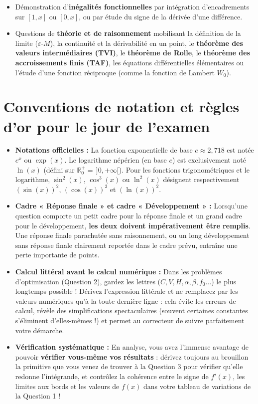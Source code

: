 \documentclass[11pt,a4paper,oneside]{book}
\newcommand{\R}{\mathbb{R}}
\begin{document}
\begin{enumerate}
\begin{itemize}
        \item Démonstration d'\textbf{inégalités fonctionnelles} par intégration d'encadrements sur $[1, x]$ ou $[0, x]$, ou par étude du signe de la dérivée d'une différence.
        \item Questions de \textbf{théorie et de raisonnement} mobilisant la définition de la limite ($\varepsilon$-$M$), la continuité et la dérivabilité en un point, le \textbf{théorème des valeurs intermédiaires (TVI)}, le \textbf{théorème de Rolle}, le \textbf{théorème des accroissements finis (TAF)}, les équations différentielles élémentaires ou l'étude d'une fonction réciproque (comme la fonction de Lambert $W_0$).
    \end{itemize}
\end{enumerate}

\section*{Conventions de notation et règles d'or pour le jour de l'examen}

\begin{itemize}
    \item \textbf{Notations officielles :} La fonction exponentielle de base $e \approx 2,718$ est notée $e^x$ ou $\exp(x)$. Le logarithme népérien (en base $e$) est exclusivement noté $\ln(x)$ (défini sur $\R_0^+ = \,]0, +\infty[$). Pour les fonctions trigonométriques et le logarithme, $\sin^2(x)$, $\cos^3(x)$ ou $\ln^2(x)$ désignent respectivement $(\sin(x))^2$, $(\cos(x))^3$ et $(\ln(x))^2$.
    \item \textbf{Cadre « Réponse finale » et cadre « Développement » :} Lorsqu'une question comporte un petit cadre pour la réponse finale et un grand cadre pour le développement, \textbf{les deux doivent impérativement être remplis}. Une réponse finale parachutée sans raisonnement, ou un long développement sans réponse finale clairement reportée dans le cadre prévu, entraîne une perte importante de points.
    \item \textbf{Calcul littéral avant le calcul numérique :} Dans les problèmes d'optimisation (Question 2), gardez les lettres ($C, V, H, \alpha, \beta, f_0\dots$) le plus longtemps possible ! Dérivez l'expression littérale et ne remplacez par les valeurs numériques qu'à la toute dernière ligne : cela évite les erreurs de calcul, révèle des simplifications spectaculaires (souvent certaines constantes s'éliminent d'elles-mêmes !) et permet au correcteur de suivre parfaitement votre démarche.
    \item \textbf{Vérification systématique :} En analyse, vous avez l'immense avantage de pouvoir \textbf{vérifier vous-même vos résultats} : dérivez toujours au brouillon la primitive que vous venez de trouver à la Question 3 pour vérifier qu'elle redonne l'intégrande, et contrôlez la cohérence entre le signe de $f'(x)$, les limites aux bords et les valeurs de $f(x)$ dans votre tableau de variations de la Question 1 !
\end{itemize}
\end{document}
